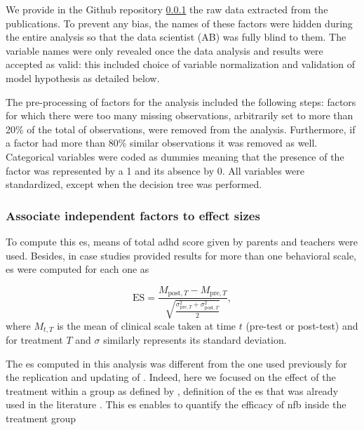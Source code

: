 We provide in the Github repository \ref{} the raw data extracted from the publications. To prevent any bias, the names of these factors
were hidden during the entire analysis so that the data scientist (AB) was fully blind to them. The variable names were only revealed once the data 
analysis and results were accepted as valid: this included choice of variable normalization and validation of model hypothesis as detailed below.

The pre-processing of factors for the analysis included the following steps: factors for which there were too many missing observations, 
arbitrarily set to more than 20\% of the total of observations, were removed from the analysis. Furthermore, if a factor had more than 
80\% similar observations it was removed as well. Categorical variables were coded as dummies meaning that the presence of the factor was represented by a 1 
and its absence by 0. All variables were standardized, except when the decision tree was performed. 


\subsubsection{Associate independent factors to effect sizes}

To compute this \gls{es}, means of total \gls{adhd} score given by parents and teachers were used. Besides, in case studies provided results 
for more than one behavioral scale, \gls{es} were computed for each one as 

\begin{equation}
\label{eq:factors_effect_size_within_subject}
\text{ES} = \frac{M_{\text{post},T} - M_{\text{pre},T}}{\sqrt{\frac{\sigma_{\text{pre},T}^2 + \sigma_{\text{post},T}^2}{2}}},
\end{equation} 
where $M_{t,T}$ is the mean of clinical scale taken at time $t$ (pre-test or post-test) and for treatment $T$ and $\sigma$ similarly represents its standard deviation.

The \gls{es} computed in this analysis was different from the one 
used previously for the replication and updating of \citet{Cortese2016}. Indeed, here we focused on the effect of the treatment within 
a group as defined by \citet{Cohen1988}, definition of the \gls{es} that was already used in the literature \citep{Arns2009, Maurizio2014, 
Strehl2017}. This \gls{es} enables to quantify the efficacy of \gls{nfb} inside the treatment group 

